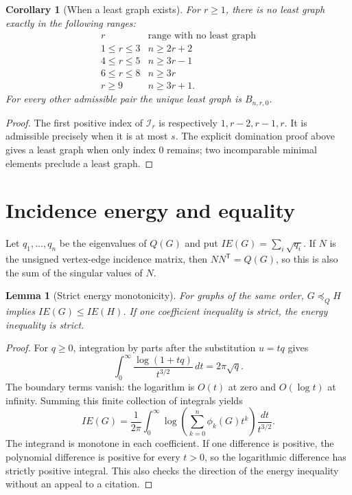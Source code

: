 \documentclass[12pt]{amsart}
\newtheorem{cor}[thm]{Corollary}
\newtheorem{lem}[thm]{Lemma}
\theoremstyle{definition}
\theoremstyle{remark}
\numberwithin{equation}{section}
\begin{document}
\begin{cor}[When a least graph exists]\label{en:least}
For $r\ge1$, there is no least graph exactly in the following ranges:
\[
 \begin{array}{c|c}
 r&\text{range with no least graph}\\\hline
 1\le r\le3&n\ge2r+2\\
 4\le r\le5&n\ge3r-1\\
 6\le r\le8&n\ge3r\\
 r\ge9&n\ge3r+1.
 \end{array}
\]
For every other admissible pair the unique least graph is $B_{n,r,0}$.
\end{cor}
\begin{proof}
The first positive index of $\mathcal I_r$ is respectively
$1,r-2,r-1,r$. It is admissible precisely when it is at most $s$.
The explicit domination proof above gives a least graph when only
index $0$ remains; two incomparable minimal elements preclude a least graph.
\end{proof}

\section{Incidence energy and equality}
Let $q_1,\ldots,q_n$ be the eigenvalues of $Q(G)$ and put
$IE(G)=\sum_i\sqrt{q_i}$. If $N$ is the unsigned vertex-edge incidence
matrix, then $NN^{\mathsf T}=Q(G)$, so this is also the sum of the
singular values of $N$.

\begin{lem}[Strict energy monotonicity]\label{en:energy}
For graphs of the same order, $G\preceq_Q H$ implies $IE(G)\le IE(H)$.
If one coefficient inequality is strict, the energy inequality is strict.
\end{lem}
\begin{proof}
For $q\ge0$, integration by parts after the substitution $u=tq$ gives
\[
 \int_0^\infty\frac{\log(1+tq)}{t^{3/2}}\,dt=2\pi\sqrt q.
\]
The boundary terms vanish: the logarithm is $O(t)$ at zero and
$O(\log t)$ at infinity. Summing this finite collection of integrals yields
\begin{equation}\label{en:IEint}
 IE(G)=\frac1{2\pi}\int_0^\infty
 \log\left(\sum_{k=0}^n\phi_k(G)t^k\right)\frac{dt}{t^{3/2}}.
\end{equation}
The integrand is monotone in each coefficient. If one difference is
positive, the polynomial difference is positive for every $t>0$, so the
logarithmic difference has strictly positive integral. This also checks
the direction of the energy inequality without an appeal to a citation.
\end{proof}
\end{document}
